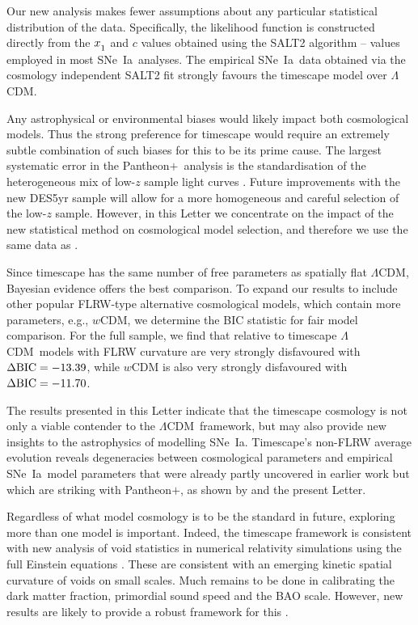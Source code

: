 \documentclass[fleqn,usenatbib,onecolumn,referee]{mnras}
\newcommand{\pplus}{Pantheon$+$}
\newcommand{\LA}{\Lambda}
\newcommand{\LCDM}{$\LA$CDM}
\newcommand{\lcdm}{spatially flat $\LA$CDM}
\newcommand{\sne}{SNe~Ia}
\newcommand{\laneetal}{\citet{Lane_2023}}
\newcommand{\Z}[1]{_{\lower2pt\hbox{$\scriptstyle#1$}}}
\begin{document}
Our new analysis makes fewer assumptions about any particular statistical distribution of the data. Specifically, the likelihood function is constructed directly from the $x\Z 1$ and $c$ values obtained using the SALT2 algorithm -- values employed in most \sne\ analyses. The empirical \sne\ data obtained via the cosmology independent SALT2 fit strongly favours the timescape model over \LCDM.

Any astrophysical or environmental biases would likely impact both cosmological models. Thus the strong preference for timescape would require an extremely subtle combination of such biases for this to be its prime cause.
The largest systematic error in the \pplus\ analysis is the standardisation of the heterogeneous mix of low-$z$ sample light curves \citep{DES_2024, Lane_2023}.  Future improvements with the new DES5yr sample \citep{DES_2024} will allow for a more homogeneous and careful selection of the low-$z$ sample. However, in this Letter we concentrate on the impact of the new statistical method on cosmological model selection, and therefore we use the same data as \laneetal. 

Since timescape has the same number of free parameters as \lcdm, Bayesian evidence offers the best comparison. To expand our results to include other popular FLRW-type alternative cosmological models, which contain more parameters, e.g., $w$CDM, we determine the BIC statistic \citep{Schwarz_1978, Kass_1995} for fair model comparison. For the full sample, we find that relative to timescape \LCDM\ models with FLRW curvature are very strongly disfavoured with $\Delta{\rm BIC} = -13.39$, while $w$CDM is also very strongly disfavoured with $\Delta{\rm BIC} = -11.70$.

The results presented in this Letter indicate that the timescape cosmology is not only a viable contender to the \LCDM\ framework, but may also provide new insights to the astrophysics of modelling \sne. 
Timescape's non-FLRW average evolution reveals degeneracies between cosmological parameters and empirical \sne\ model parameters that were already partly uncovered in earlier work \citep{Dam_2017} but which are striking with \pplus, as shown by \citet{Lane_2023} and the present Letter. 

Regardless of what model cosmology is to be the standard in future, exploring more than one model is important. Indeed, the timescape framework is consistent with new analysis of void statistics in numerical relativity simulations using the full Einstein equations \citep{Williams_2024}. These are consistent with an emerging kinetic spatial curvature of voids on small scales. Much remains to be done in calibrating the dark matter fraction, primordial sound speed and the BAO scale. However, new results are likely to provide a robust framework for this \citep{Galoppo_2024a,Galoppo_2024b}.
\end{document}
